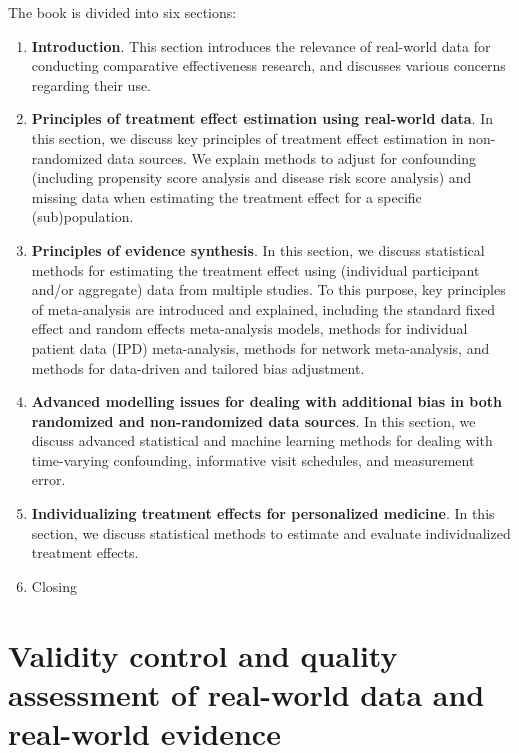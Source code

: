 \documentclass[
  letterpaper,
  DIV=11,
  numbers=noendperiod]{scrreprt}
\providecommand{\tightlist}{%
  \setlength{\itemsep}{0pt}\setlength{\parskip}{0pt}}\usepackage{longtable,booktabs,array}
\begin{document}

The book is divided into six sections:

\begin{enumerate}
\def\labelenumi{\arabic{enumi}.}
\tightlist
\item
  \textbf{Introduction}. This section introduces the relevance of
  real-world data for conducting comparative effectiveness research, and
  discusses various concerns regarding their use.
\item
  \textbf{Principles of treatment effect estimation using real-world
  data}. In this section, we discuss key principles of treatment effect
  estimation in non-randomized data sources. We explain methods to
  adjust for confounding (including propensity score analysis and
  disease risk score analysis) and missing data when estimating the
  treatment effect for a specific (sub)population.
\item
  \textbf{Principles of evidence synthesis}. In this section, we discuss
  statistical methods for estimating the treatment effect using
  (individual participant and/or aggregate) data from multiple studies.
  To this purpose, key principles of meta-analysis are introduced and
  explained, including the standard fixed effect and random effects
  meta-analysis models, methods for individual patient data (IPD)
  meta-analysis, methods for network meta-analysis, and methods for
  data-driven and tailored bias adjustment.
\item
  \textbf{Advanced modelling issues for dealing with additional bias in
  both randomized and non-randomized data sources}. In this section, we
  discuss advanced statistical and machine learning methods for dealing
  with time-varying confounding, informative visit schedules, and
  measurement error.
\item
  \textbf{Individualizing treatment effects for personalized medicine}.
  In this section, we discuss statistical methods to estimate and
  evaluate individualized treatment effects.
\item
  Closing
\end{enumerate}


\hypertarget{validity-control-and-quality-assessment-of-real-world-data-and-real-world-evidence}{%
\chapter{Validity control and quality assessment of real-world data and
real-world
evidence}\label{validity-control-and-quality-assessment-of-real-world-data-and-real-world-evidence}}
\end{document}

